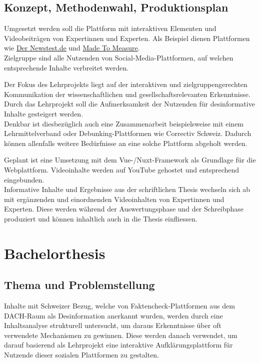 \documentclass[12pt,a4paper]{article}        %
\begin{document}
\subsection{Konzept, Methodenwahl, Produktionsplan}
Umgesetzt werden soll die Plattform mit interaktiven Elementen und Videobeiträgen von Expertinnen und Experten. Als Beispiel dienen Plattformen wie \href{https://www.der-newstest.de}{Der Newstest.de} und \href{https://madetomeasure.online/de/}{Made To Measure}.\\
Zielgruppe sind alle Nutzenden von Social-Media-Plattformen, auf welchen entsprechende Inhalte verbreitet werden.

Der Fokus des Lehrprojekts liegt auf der interaktiven und zielgruppengerechten Kommunikation der wissenschaftlichen und gesellschaftsrelevanten Erkenntnisse. Durch das Lehrprojekt soll die Aufmerksamkeit der Nutzenden für desinformative Inhalte gesteigert werden. \\
Denkbar ist diesbezüglich auch eine Zusammenarbeit beispielsweise mit einem Lehrmittelverband oder Debunking-Plattformen wie Correctiv Schweiz. Dadurch können allenfalls weitere Bedürfnisse an eine solche Plattform abgeholt werden.

Geplant ist eine Umsetzung mit dem Vue-/Nuxt-Framework als Grundlage für die Webplattform. Videoinhalte werden auf YouTube gehostet und entsprechend eingebunden.\\
Informative Inhalte und Ergebnisse aus der schriftlichen Thesis wechseln sich ab mit ergänzenden und einordnenden Videoinhalten von Expertinnen und Experten. Diese werden während der Auswertungsphase und der Schreibphase produziert und können inhaltlich auch in die Thesis einfliessen.

\section{Bachelorthesis}
\subsection{Thema und Problemstellung}
Inhalte mit Schweizer Bezug, welche von Faktencheck-Plattformen aus dem DACH-Raum als Desinformation anerkannt wurden, werden durch eine Inhaltsanalyse strukturell untersucht, um daraus Erkenntnisse über oft verwendete Mechanismen zu gewinnen. Diese werden danach verwendet, um darauf basierend als Lehrprojekt eine interaktive Aufklärungsplattform für Nutzende dieser sozialen Plattformen zu gestalten.
\end{document}
